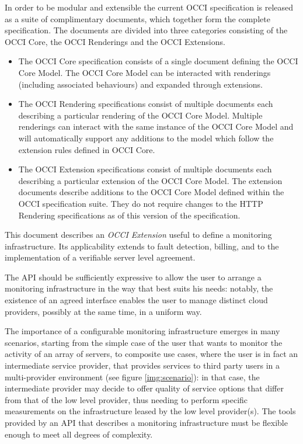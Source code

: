 \documentclass[10pt,a4paper]{article}
\begin{document}
In order to be modular and extensible the current OCCI specification is released as a suite of complimentary documents, which together form the complete specification. The documents are divided into three categories consisting of the OCCI Core, the OCCI Renderings and the OCCI Extensions.
\begin{itemize}
\item The OCCI Core specification consists of a single document defining the OCCI Core Model. The OCCI Core Model can be interacted with renderings (including associated behaviours) and expanded through extensions.
\item The OCCI Rendering specifications consist of multiple documents each describing a particular rendering of the OCCI Core Model. Multiple renderings can interact with the same instance of the OCCI Core Model and will automatically support any additions to the model which follow the extension rules defined in OCCI Core.
\item The OCCI Extension specifications consist of multiple documents each describing a particular extension of the OCCI Core Model. The extension documents describe additions to the OCCI Core Model defined within the OCCI specification suite. They do not require changes to the HTTP Rendering specifications as of this version of the specification.
\end{itemize}

This document describes an {\em OCCI Extension} useful to define a monitoring infrastructure. Its applicability extends to fault detection, billing, and to the implementation of a verifiable server level agreement.

The API should be sufficiently expressive to allow the user to arrange a monitoring infrastructure in the way that best suits his needs: notably, the existence of an agreed interface enables the user to manage distinct cloud providers, possibly at the same time, in a uniform way.

The importance of a configurable monitoring infrastructure emerges in many scenarios, starting from the simple case of the user that wants to monitor the activity of an array of servers, to composite use cases, where the user is in fact an intermediate service provider, that provides services to third party users in a multi-provider environment (see figure \ref{img:scenario}): in that case, the intermediate provider may decide to offer quality of service options that differ from that of the low level provider, thus needing to perform specific measurements on the infrastructure leased by the low level provider(s). The tools provided by an API that describes a monitoring infrastructure must be flexible enough to meet all degrees of complexity.
\end{document}
